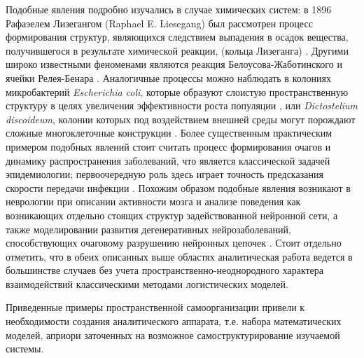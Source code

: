 Подобные явления подробно изучались в случае химических систем: в 1896 Рафаэелем Лизегангом (Raphael E. Liesegang)  был рассмотрен процесс формирования структур, являющихся следствием выпадения в осадок вещества, получившегося в результате химической реакции, (кольца Лизеганга) \cite{leis}. Другими широко известными феноменами являются реакция Белоусова-Жаботинского \cite{belousov} и ячейки Релея-Бенара \cite{benard}. Аналогичные процессы можно наблюдать в колониях микробактерий \emph{Escherichia coli}, которые образуют слоистую пространственную структуру в целях увеличения эффективности роста популяции \cite{ecoli}, или \textit{Dictostelium discoideum}, колонии которых под воздействием внешней среды могут порождают сложные многоклеточные конструкции \cite{disc}. Более существенным практическим примером подобных явлений стоит считать процесс формирования очагов и динамику распространения заболеваний, что является классической задачей эпидемиологии; первоочередную роль здесь играет точность предсказания скорости передачи инфекции  \cite{HUPPERT2013999}. Похожим образом подобные явления возникают в неврологии при описании активности мозга и анализе поведения как возникающих отдельно стоящих структур задействованной нейронной сети, а также моделировании развития дегенеративных нейрозаболеваний, способствующих очаговому разрушению нейронных цепочек \cite{Rabinovich:2010}. Стоит отдельно отметить, что в обеих описанных выше областях аналитическая работа ведется в большинстве случаев без учета пространственно-неоднородного характера взаимодействий классическими методами логистических моделей.

Приведенные примеры пространственной самоорганизации привели к необходимости создания аналитического аппарата, т.е. набора математических моделей, априори заточенных на возможное самоструктурирование изучаемой системы. 

